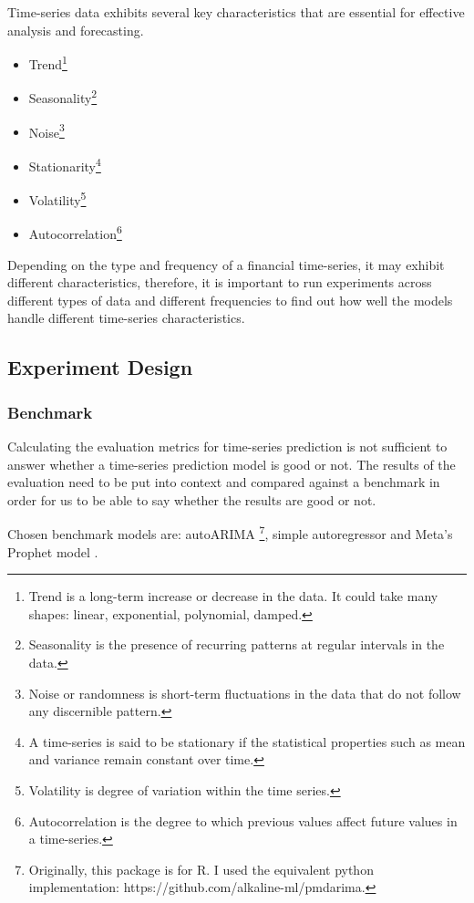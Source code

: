 Time-series data exhibits several key characteristics that are essential for effective analysis and forecasting.

\begin{itemize}
    \item Trend\footnote{Trend is a long-term increase or decrease in the data. It could take many shapes: linear, exponential, polynomial, damped.}
    \item Seasonality\footnote{Seasonality is the presence of recurring patterns at regular intervals in the data.}
    \item Noise\footnote{Noise or randomness is short-term fluctuations in the data that do not follow any discernible pattern.}
    \item Stationarity\footnote{A time-series is said to be stationary if the statistical properties such as mean and variance remain constant over time.}
    \item Volatility\footnote{Volatility is degree of variation within the time series.}
    \item Autocorrelation\footnote{Autocorrelation is the degree to which previous values affect future values in a time-series.}
\end{itemize}



Depending on the type and frequency of a financial time-series, it may exhibit different characteristics, therefore, it is important to run experiments across different types of data and different frequencies to find out how well the models handle different time-series characteristics.



\subsection{Experiment Design}

\subsubsection{Benchmark}

Calculating the evaluation metrics for time-series prediction is not sufficient to answer whether a time-series prediction model is good or not. The results of the evaluation need to be put into context and compared against a benchmark in order for us to be able to say whether the results are good or not. 

Chosen benchmark models are: autoARIMA \cite{hyndman2008automatic}\footnote{Originally, this package is for R. I used the equivalent python implementation: https://github.com/alkaline-ml/pmdarima.}, simple autoregressor and Meta's Prophet model \cite{taylor2018forecasting}.

